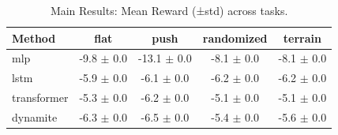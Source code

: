 \begin{table}[h]
\centering
\caption{Main Results: Mean Reward (±std) across tasks.}
\label{tab:main}
\begin{tabular}{lcccc}
\toprule
Method & flat & push & randomized & terrain \\
\midrule
mlp & -9.8 $\pm$ 0.0 & -13.1 $\pm$ 0.0 & -8.1 $\pm$ 0.0 & -8.1 $\pm$ 0.0 \\
lstm & -5.9 $\pm$ 0.0 & -6.1 $\pm$ 0.0 & -6.2 $\pm$ 0.0 & -6.2 $\pm$ 0.0 \\
transformer & -5.3 $\pm$ 0.0 & -6.2 $\pm$ 0.0 & -5.1 $\pm$ 0.0 & -5.1 $\pm$ 0.0 \\
dynamite & -6.3 $\pm$ 0.0 & -6.5 $\pm$ 0.0 & -5.4 $\pm$ 0.0 & -5.6 $\pm$ 0.0 \\
\bottomrule
\end{tabular}
\end{table}